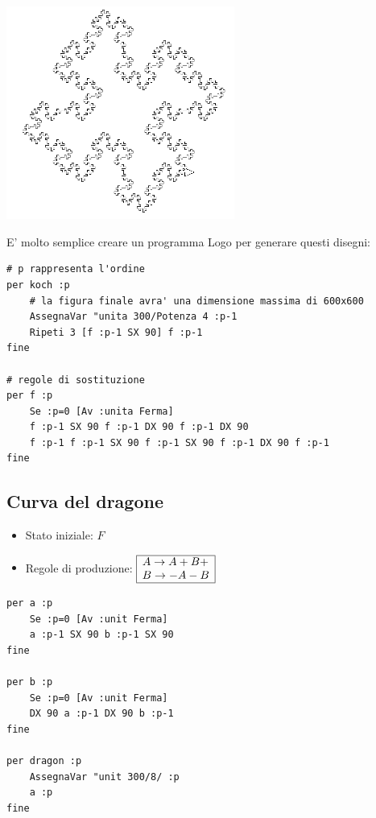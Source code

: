 \begin{center}
\begin{minipage}{7.5cm}
 \includegraphics[width=7.5cm]{pics/linden-koch4.png}
\end{minipage}
\end{center}

E' molto semplice creare un programma Logo per generare questi disegni:

\begin{lstlisting}[caption="Curva quadratica di Van Koch"]
# p rappresenta l'ordine
per koch :p
	# la figura finale avra' una dimensione massima di 600x600
	AssegnaVar "unita 300/Potenza 4 :p-1
	Ripeti 3 [f :p-1 SX 90] f :p-1 
fine

# regole di sostituzione
per f :p
	Se :p=0 [Av :unita Ferma]
	f :p-1 SX 90 f :p-1 DX 90 f :p-1 DX 90
	f :p-1 f :p-1 SX 90 f :p-1 SX 90 f :p-1 DX 90 f :p-1
fine
\end{lstlisting}


\subsection{Curva del dragone}
\begin{itemize}
	\item[\textbullet] Stato iniziale: $F$\\
	\item[\textbullet] Regole di produzione:
	$
	\begin{array}{|l|}
		\hline
		A\rightarrow A+B+ \\
		B\rightarrow -A-B \\
		\hline
	\end{array}
	$ 
\end{itemize}

\begin{lstlisting}[caption="Curva del dragone"]
per a :p
	Se :p=0 [Av :unit Ferma]
	a :p-1 SX 90 b :p-1 SX 90
fine

per b :p
	Se :p=0 [Av :unit Ferma]
	DX 90 a :p-1 DX 90 b :p-1
fine

per dragon :p
	AssegnaVar "unit 300/8/ :p  
	a :p
fine
\end{lstlisting}

